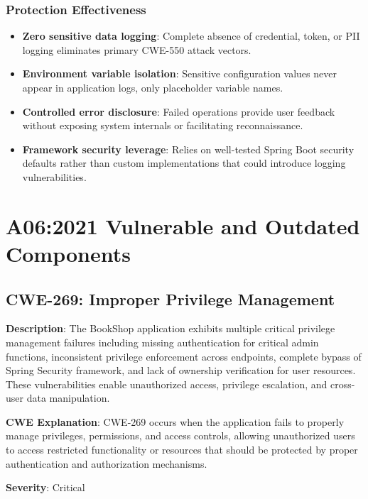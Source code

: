 \documentclass[]{UCD_CS_FYP_Report}
\begin{document}
\subsection{Protection Effectiveness}
\begin{itemize}
	\item \textbf{Zero sensitive data logging}: Complete absence of credential, token, or PII logging eliminates primary CWE-550 attack vectors.
	\item \textbf{Environment variable isolation}: Sensitive configuration values never appear in application logs, only placeholder variable names.
	\item \textbf{Controlled error disclosure}: Failed operations provide user feedback without exposing system internals or facilitating reconnaissance.
	\item \textbf{Framework security leverage}: Relies on well-tested Spring Boot security defaults rather than custom implementations that could introduce logging vulnerabilities.
\end{itemize}





\chapter{A06:2021 Vulnerable and Outdated Components}

\section{CWE-269: Improper Privilege Management}

\textbf{Description}: The BookShop application exhibits multiple critical privilege management failures including missing authentication for critical admin functions, inconsistent privilege enforcement across endpoints, complete bypass of Spring Security framework, and lack of ownership verification for user resources. These vulnerabilities enable unauthorized access, privilege escalation, and cross-user data manipulation.

\textbf{CWE Explanation}: CWE-269 occurs when the application fails to properly manage privileges, permissions, and access controls, allowing unauthorized users to access restricted functionality or resources that should be protected by proper authentication and authorization mechanisms.

\textbf{Severity}: Critical
\end{document}
